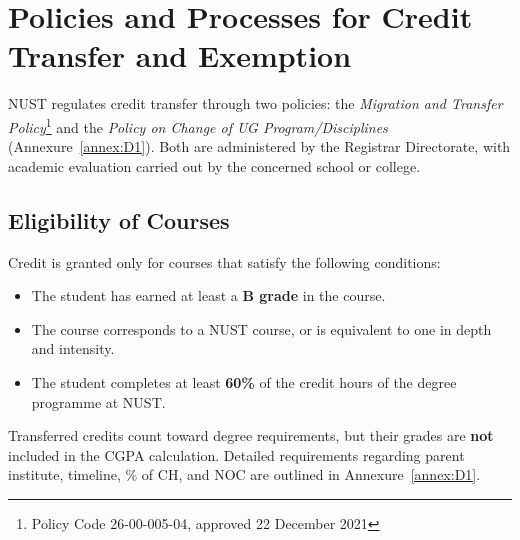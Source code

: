 
\section{Policies and Processes for Credit Transfer and Exemption}
\label{app:criteria3-credit-transfer}

NUST regulates credit transfer through two policies: the \textit{Migration and Transfer Policy}\footnote{Policy Code 26-00-005-04, approved 22 December 2021} and the \textit{Policy on Change of UG Program/Disciplines} (Annexure~\ref{annex:D1}). Both are administered by the Registrar Directorate, with academic evaluation carried out by the concerned school or college.

\subsection{Eligibility of Courses}
Credit is granted only for courses that satisfy the following conditions:
\begin{itemize}
    \item The student has earned at least a \textbf{B grade} in the course.
    \item The course corresponds to a NUST course, or is equivalent to one in depth and intensity.
    \item The student completes at least \textbf{60\%} of the credit hours of the degree programme at NUST.
\end{itemize}
Transferred credits count toward degree requirements, but their grades are \textbf{not} included in the CGPA calculation. Detailed requirements regarding parent institute, timeline, \% of CH, and NOC are outlined in Annexure~\ref{annex:D1}.


